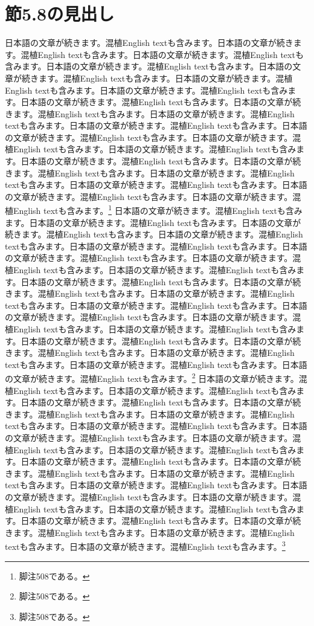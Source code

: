 \documentclass[pdflatex,book]{jlreq}
\begin{document}
\section{節5.8の見出し}
日本語の文章が続きます。混植English textも含みます。日本語の文章が続きます。混植English textも含みます。日本語の文章が続きます。混植English textも含みます。日本語の文章が続きます。混植English textも含みます。日本語の文章が続きます。混植English textも含みます。日本語の文章が続きます。混植English textも含みます。日本語の文章が続きます。混植English textも含みます。日本語の文章が続きます。混植English textも含みます。日本語の文章が続きます。混植English textも含みます。日本語の文章が続きます。混植English textも含みます。日本語の文章が続きます。混植English textも含みます。日本語の文章が続きます。混植English textも含みます。日本語の文章が続きます。混植English textも含みます。日本語の文章が続きます。混植English textも含みます。日本語の文章が続きます。混植English textも含みます。日本語の文章が続きます。混植English textも含みます。日本語の文章が続きます。混植English textも含みます。日本語の文章が続きます。混植English textも含みます。日本語の文章が続きます。混植English textも含みます。日本語の文章が続きます。混植English textも含みます。\footnote{脚注508である。}
日本語の文章が続きます。混植English textも含みます。日本語の文章が続きます。混植English textも含みます。日本語の文章が続きます。混植English textも含みます。日本語の文章が続きます。混植English textも含みます。日本語の文章が続きます。混植English textも含みます。日本語の文章が続きます。混植English textも含みます。日本語の文章が続きます。混植English textも含みます。日本語の文章が続きます。混植English textも含みます。日本語の文章が続きます。混植English textも含みます。日本語の文章が続きます。混植English textも含みます。日本語の文章が続きます。混植English textも含みます。日本語の文章が続きます。混植English textも含みます。日本語の文章が続きます。混植English textも含みます。日本語の文章が続きます。混植English textも含みます。日本語の文章が続きます。混植English textも含みます。日本語の文章が続きます。混植English textも含みます。日本語の文章が続きます。混植English textも含みます。日本語の文章が続きます。混植English textも含みます。日本語の文章が続きます。混植English textも含みます。日本語の文章が続きます。混植English textも含みます。\footnote{脚注508である。}
日本語の文章が続きます。混植English textも含みます。日本語の文章が続きます。混植English textも含みます。日本語の文章が続きます。混植English textも含みます。日本語の文章が続きます。混植English textも含みます。日本語の文章が続きます。混植English textも含みます。日本語の文章が続きます。混植English textも含みます。日本語の文章が続きます。混植English textも含みます。日本語の文章が続きます。混植English textも含みます。日本語の文章が続きます。混植English textも含みます。日本語の文章が続きます。混植English textも含みます。日本語の文章が続きます。混植English textも含みます。日本語の文章が続きます。混植English textも含みます。日本語の文章が続きます。混植English textも含みます。日本語の文章が続きます。混植English textも含みます。日本語の文章が続きます。混植English textも含みます。日本語の文章が続きます。混植English textも含みます。日本語の文章が続きます。混植English textも含みます。日本語の文章が続きます。混植English textも含みます。日本語の文章が続きます。混植English textも含みます。日本語の文章が続きます。混植English textも含みます。\footnote{脚注508である。}
\end{document}
